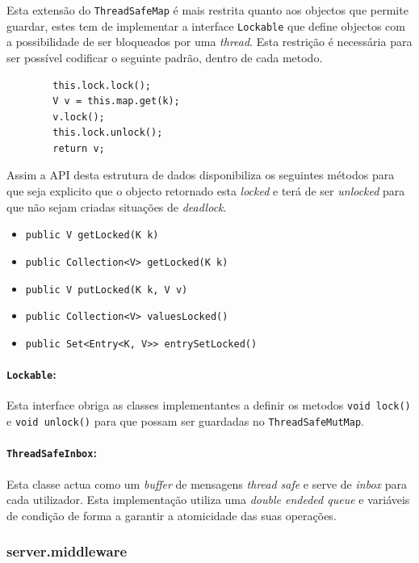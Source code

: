 \documentclass[a4paper]{article}
\begin{document}
Esta extensão do \texttt{ThreadSafeMap} é mais restrita quanto aos objectos que permite guardar, estes tem de implementar a interface \texttt{Lockable} que define objectos com a possibilidade de ser bloqueados por uma \textit{thread}. Esta restrição é necessária para ser possível codificar o seguinte padrão, dentro de cada metodo.

    \begin{verbatim}
        this.lock.lock();
        V v = this.map.get(k);
        v.lock();
        this.lock.unlock();
        return v;
    \end{verbatim}

Assim a API desta estrutura de dados disponibiliza os seguintes métodos para que seja explicito que o objecto retornado esta \textit{locked} e terá de ser \textit{unlocked} para que não sejam criadas situações de \textit{deadlock}.

\begin{itemize}
    \item \texttt{public V getLocked(K k)}
    \item \texttt{public Collection<V> getLocked(K k)}
    \item \texttt{public V putLocked(K k, V v)}
    \item \texttt{public Collection<V> valuesLocked()}
    \item \texttt{public Set<Entry<K, V>> entrySetLocked()}
\end{itemize}

\paragraph{\texttt{Lockable}:}

Esta interface obriga as classes implementantes a definir os metodos \texttt{void lock()} e \texttt{void unlock()} para que possam ser guardadas no \texttt{ThreadSafeMutMap}.

\paragraph{\texttt{ThreadSafeInbox}:}

Esta classe actua como um \textit{buffer} de mensagens \textit{thread safe} e serve de \textit{inbox} para cada utilizador. Esta implementação utiliza uma \textit{double endeded queue} e variáveis de condição de forma a garantir a atomicidade das suas operações. 



\subsubsection{server.middleware}
\end{document}

